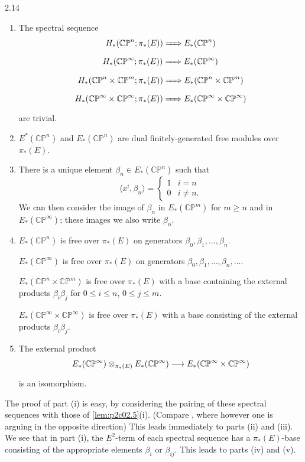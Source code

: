 \documentclass[../main]{subfiles}
\begin{document}
\begin{customlemma}{2.14}
\label{lem:p2c02.14}
\begin{enumerate}
    \item[(i)] The spectral sequence \[H_\ast(\mathbb {CP}^n; \pi_\ast(E)) \xRightarrow{\phantom{.....}} E_\ast(\mathbb {CP}^n)\] \[H_\ast(\mathbb {CP}^\infty; \pi_\ast(E)) \xRightarrow{\phantom{.....}} E_\ast(\mathbb {CP}^\infty)\]\[H_\ast(\mathbb {CP}^n \times \mathbb {CP}^m; \pi_\ast(E)) \xRightarrow{\phantom{.....}} E_\ast(\mathbb {CP}^n \times \mathbb {CP}^m)\]\[H_\ast(\mathbb {CP}^\infty \times \mathbb {CP}^\infty; \pi_\ast(E)) \xRightarrow{\phantom{.....}} E_\ast(\mathbb {CP}^\infty \times \mathbb {CP}^\infty)\] are trivial.
    \item[(ii)] $E^\ast(\mathbb {CP}^n)$ and $E_\ast(\mathbb {CP}^n)$ are dual finitely-generated free modules over $\pi_\ast(E)$.
    \item[(iii)] There is a unique element $\beta_n \in E_\ast(\mathbb {CP}^n)$ such that \[\langle x^i, \beta_n\rangle = \begin{cases}1 & i = n \\ 0 & i \ne n.\end{cases}\] We can then consider the image of $\beta_n$ in $E_\ast(\mathbb {CP}^m)$ for $m \ge n$ and in $E_\ast(\mathbb {CP}^\infty)$; these images we also write $\beta_n$.
    \item[(iv)] $E_\ast(\mathbb {CP}^n)$ is free over $\pi_\ast(E)$ on generators $\beta_0, \beta_1, \ldots, \beta_n$.
    
    $E_\ast(\mathbb {CP}^\infty)$ is free over $\pi_\ast(E)$ on generators $\beta_0, \beta_1, \ldots, \beta_n, \ldots$.
    
    $E_\ast(\mathbb {CP}^n \times \mathbb {CP}^m)$ is free over $\pi_\ast(E)$ with a base containing the external products $\beta_i \beta_j$ for $0 \le i \le n$, $0 \le j \le m$. 
    
    $E_\ast(\mathbb {CP}^\infty \times \mathbb {CP}^\infty)$ is free over $\pi_\ast(E)$ with a base consisting of the external products $\beta_i \beta_j$. 
    \item[(v)] The external product \[E_\ast(\mathbb {CP}^\infty) \otimes_{\pi_\ast(E)} E_\ast(\mathbb {CP}^\infty) \lar{} E_\ast(\mathbb {CP}^\infty \times \mathbb {CP}^\infty)\] is an isomorphism.
\end{enumerate}
\end{customlemma}

The proof of part (i) is easy, by considering the pairing of these spectral sequences with those of \ref{lem:p2c02.5}(i). (Compare \cite[p.~21]{adams3}, where however one is arguing in the opposite direction) This leads immediately to parts (ii) and (iii). We see that in part (i), the $E^2$-term of each spectral sequence has a $\pi_\ast(E)$-base consisting of the appropriate elements $\beta_i$ or $\beta_{ij}$. This leads to parts (iv) and (v).
\end{document}
